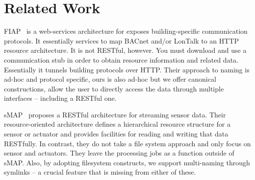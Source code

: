 \section{Related Work}

FIAP~\cite{fiap} is a web-services architecture for exposes building-specific communication protocols.  It essentially services to
map BACnet and/or LonTalk to an HTTP resource architecture.  It is not RESTful, however.  You must download and use a communication
stub in order to obtain resource information and related data.  Essentially it tunnels building protocols over HTTP.
Their approach to naming is ad-hoc and protocol specific, ours is also ad-hoc but we offer canonical constructions, allow 
the user to directly access the data through multiple interfaces -- including a RESTful one.

sMAP~\cite{smap} proposes a RESTful architecture for streaming sensor data.  Their resource-oriented architecture defines a 
hierarchical resource structure for a sensor or actuator and provides facilities for reading and writing that data RESTfully.
In contrast, they do not take a file system approach and only focus on sensor and actuators.  They leave the processing jobs
as a function outside of sMAP.  Also, by adopting filesystem constructs, we support multi-naming through symlinks -- a 
crucial feature that is missing from either of these.

